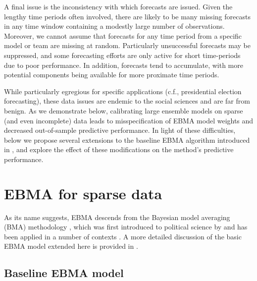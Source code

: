 \documentclass[12pt,fullpage,endnotes]{article}
\begin{document}
A final issue is the inconsistency with which forecasts are
issued. Given the lengthy time periods often involved, there are
likely to be many missing forecasts in any time window containing a
modestly large number of observations.  Moreover, we cannot assume
that forecasts for any time period from a specific model or team are
missing at random.  Particularly unsuccessful forecasts may be
suppressed, and some forecasting efforts are only active for short
time-periods due to poor performance.  In addition, forecasts tend to
accumulate, with more potential components being available for more
proximate time periods.

While particularly egregious for specific applications (c.f.,
presidential election forecasting), these data issues are endemic to
the social sciences and are far from benign. As we demonstrate below,
calibrating large ensemble models on sparse (and even incomplete) data
leads to misspecification of EBMA model weights and decreased
out-of-sample predictive performance. In light of these difficulties,
below we propose several extensions to the baseline EBMA algorithm
introduced in
,
and explore the effect of these modifications on the method's
predictive performance.

\section{EBMA for sparse data} 
\label{model}


As its name suggests, EBMA descends from the Bayesian model averaging
(BMA) methodology \citep[c.f.,][]{Madigan:1994, Raftery:1995,
  Hoeting:1999, Clyde:2003, Clyde:2004}, which was first introduced to
political science by \citet{Bartels:1997} and has been applied in a
number of contexts \citep[e.g.,][]{Bartels:2001, Gill:2004, Imai:2004,
  Montgomery:2010}. A more detailed discussion of the basic EBMA
model extended here is provided in
.

\subsection{Baseline EBMA model}
\end{document}
